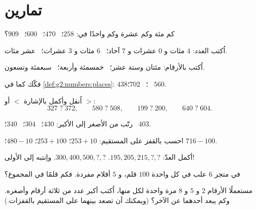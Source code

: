 \section{تمارين}

\begin{exercise}[$\star$]\label{exo:g2:numbers:1}
كم مئة وكم عشرة وكم واحدًا في: $258$؛ \ $470$؛ \ $600$؛ \
$909$؟
\end{exercise}

\begin{exercise}[$\star$]\label{exo:g2:numbers:2}
اُكتب العدد: $4$ مئات و $0$ عشرات و $7$ آحاد؛ \ $6$ مئات
و $3$ عشرات؛ \ عشر مئات.
\end{exercise}

\begin{exercise}[$\star$]\label{exo:g2:numbers:3}
اُكتب بالأرقام: مئتان وستة عشر؛ \ خمسمئة وأربعة؛ \
سبعمئة وتسعون.
\end{exercise}

\begin{exercise}[$\star$]\label{exo:g2:numbers:4}
فكّك كما في \cref{def:g2:numbers:places}: $438$؛ \ $702$؛ \
$560$.
\end{exercise}

\begin{exercise}[$\star$]\label{exo:g2:numbers:5}
اُنقل وأكمل بالإشارة $<$ أو $>$:
\[
327 \;?\; 372, \qquad
580 \;?\; 508, \qquad
199 \;?\; 200, \qquad
640 \;?\; 604 .
\]
\end{exercise}

\begin{exercise}[$\star$]\label{exo:g2:numbers:6}
رتّب من الأصغر إلى الأكبر: $430$؛ \ $304$؛ \ $340$؛ \ $403$.
\end{exercise}

\begin{exercise}[$\star$]\label{exo:g2:numbers:7}
احسب بالقفز على المستقيم: $253 + 10$؛ \quad $253 + 100$؛
\quad $480 - 10$؛ \quad $716 - 100$.
\end{exercise}

\begin{exercise}[$\star$]\label{exo:g2:numbers:8}
أكمل العدّ: $195, 205, 215, ?, ?$. \quad
$300, 400, 500, ?, ?$. \quad واِنتبه إلى الأولى!
\end{exercise}

\begin{exercise}[$\star$]\label{exo:g2:numbers:9}
في متجر $6$ علب في كل واحدة $100$ قلم، و $5$ أقلام مفردة. فكم
قلمًا في المجموع؟
\end{exercise}

\begin{exercise}[$\star\star$]\label{exo:g2:numbers:10}
مستعملًا الأرقام $2$ و $5$ و $8$ مرة واحدة لكل منها، اُكتب أكبر
عدد من ثلاثة أرقام وأصغره. وكم يبعد أحدهما عن الآخر؟
(ويمكنك أن تصعد بينهما على المستقيم بالقفزات.)
\end{exercise}
